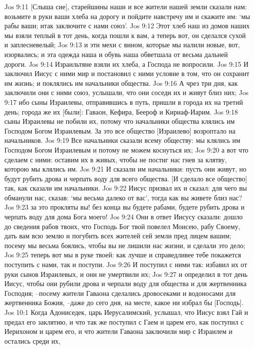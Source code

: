 Jos 9:11  [Слыша сие], старейшины наши и все жители нашей земли сказали нам: возьмите в руки ваши хлеба на дорогу и пойдите навстречу им и скажите им: `мы рабы ваши; итак заключите с нами союз'.
Jos 9:12  Этот хлеб наш из домов наших мы взяли теплый в тот день, когда пошли к вам, а теперь вот, он сделался сухой и заплесневелый;
Jos 9:13  и эти мехи с вином, которые мы налили новые, вот, изорвались; и эта одежда наша и обувь наша обветшала от весьма дальней дороги.
Jos 9:14  Израильтяне взяли их хлеба, а Господа не вопросили.
Jos 9:15  И заключил Иисус с ними мир и постановил с ними условие в том, что он сохранит им жизнь; и поклялись им начальники общества.
Jos 9:16  А чрез три дня, как заключили они с ними союз, услышали, что они соседи их и живут близ них;
Jos 9:17  ибо сыны Израилевы, отправившись в путь, пришли в города их на третий день; города же их [были]: Гаваон, Кефира, Беероф и Кириаф-Иарим.
Jos 9:18  сыны Израилевы не побили их, потому что начальники общества клялись им Господом Богом Израилевым. За это все общество [Израилево] возроптало на начальников.
Jos 9:19  Все начальники сказали всему обществу: мы клялись им Господом Богом Израилевым и потому не можем коснуться их;
Jos 9:20  а вот что сделаем с ними: оставим их в живых, чтобы не постиг нас гнев за клятву, которою мы клялись им.
Jos 9:21  И сказали им начальники: пусть они живут, но будут рубить дрова и черпать воду для всего общества. [И сделало все общество] так, как сказали им начальники.
Jos 9:22  Иисус призвал их и сказал: для чего вы обманули нас, сказав: `мы весьма далеко от вас', тогда как вы живете близ нас?
Jos 9:23  за это прокляты вы! без конца вы будете рабами, будете рубить дрова и черпать воду для дома Бога моего!
Jos 9:24  Они в ответ Иисусу сказали: дошло до сведения рабов твоих, что Господь Бог твой повелел Моисею, рабу Своему, дать вам всю землю и погубить всех жителей сей земли пред лицем вашим; посему мы весьма боялись, чтобы вы не лишили нас жизни, и сделали это дело;
Jos 9:25  теперь вот мы в руке твоей: как лучше и справедливее тебе покажется поступить с нами, так и поступи.
Jos 9:26  И поступил с ними так: избавил их от руки сынов Израилевых, и они не умертвили их;
Jos 9:27  и определил в тот день Иисус, чтобы они рубили дрова и черпали воду для общества и для жертвенника Господня; --посему жители Гаваона сделались дровосеками и водоносами для жертвенника Божия, --даже до сего дня, на месте, какое ни избрал бы [Господь].
Jos 10:1  Когда Адониседек, царь Иерусалимский, услышал, что Иисус взял Гай и предал его заклятию, и что так же поступил с Гаем и царем его, как поступил с Иерихоном и царем его, и что жители Гаваона заключили мир с Израилем и остались среди их,
